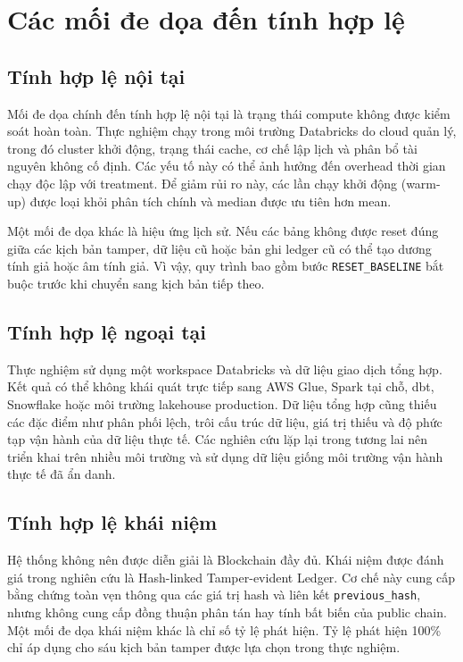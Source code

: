 \section{Các mối đe dọa đến tính hợp
lệ}\label{sec:threats}

\subsection{Tính hợp lệ nội
tại}\label{sec:sec:validitynoitai}

Mối đe dọa chính đến tính hợp lệ nội tại là trạng thái compute không
được kiểm soát hoàn toàn. Thực nghiệm chạy trong môi trường Databricks
do cloud quản lý, trong đó cluster khởi động, trạng thái cache, cơ chế
lập lịch và phân bổ tài nguyên không cố định. Các yếu tố này có thể ảnh
hưởng đến overhead thời gian chạy độc lập với treatment. Để giảm rủi ro
này, các lần chạy khởi động (warm-up) được loại khỏi phân tích chính và
median được ưu tiên hơn mean.

Một mối đe dọa khác là hiệu ứng lịch sử. Nếu các bảng không được reset
đúng giữa các kịch bản tamper, dữ liệu cũ hoặc bản ghi ledger cũ có thể
tạo dương tính giả hoặc âm tính giả. Vì vậy, quy trình bao gồm bước
\texttt{RESET\_BASELINE} bắt buộc trước khi chuyển sang kịch bản tiếp theo.

\subsection{Tính hợp lệ ngoại
tại}\label{sec:validitingoaitai}

Thực nghiệm sử dụng một workspace Databricks và dữ liệu giao dịch tổng
hợp. Kết quả có thể không khái quát trực tiếp sang AWS Glue, Spark tại
chỗ, dbt, Snowflake hoặc môi trường lakehouse production. Dữ liệu tổng
hợp cũng thiếu các đặc điểm như phân phối lệch, trôi cấu trúc dữ liệu,
giá trị thiếu và độ phức tạp vận hành của dữ liệu thực tế. Các nghiên
cứu lặp lại trong tương lai nên triển khai trên nhiều môi trường và sử
dụng dữ liệu giống môi trường vận hành thực tế đã ẩn danh.

\subsection{Tính hợp lệ khái
niệm}\label{sec:validitykhainiem}

Hệ thống không nên được diễn giải là Blockchain đầy đủ. Khái niệm được
đánh giá trong nghiên cứu là Hash-linked Tamper-evident Ledger. Cơ chế
này cung cấp bằng chứng toàn vẹn thông qua các giá trị hash và liên kết
\texttt{previous\_hash}, nhưng không cung cấp đồng thuận phân tán hay
tính bất biến của public chain. Một mối đe dọa khái niệm khác là chỉ số
tỷ lệ phát hiện. Tỷ lệ phát hiện 100\% chỉ áp dụng cho sáu kịch bản
tamper được lựa chọn trong thực nghiệm.

